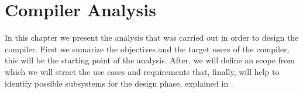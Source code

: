\setchapterpreamble[u]{\margintoc}
\chapter{Compiler Analysis}

In this chapter we present the analysis that was carried out in order to design the compiler. First we sumarize the objectives and the target users of the compiler, this will be the starting point of the analysis. After, we will define an scope from which we will stract the use cases and requirements that, finally, will help to identify possible subsystems for the design phase, explained in .












